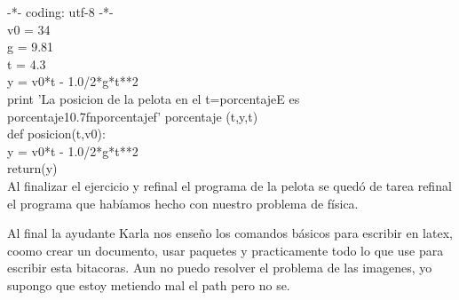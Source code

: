 \documentclass[letterpaper, 12pt, oneside]{article}
\begin{document}
\begin{enumerate}
\begin{enumerate}
			
			
			-*- coding: utf-8 -*-\\
			v0 = 34\\
			g = 9.81\\
			t = 4.3\\
			y = v0*t - 1.0/2*g*t**2\\
			print 'La posicion de la pelota en el t=porcentajeE es porcentaje10.7fnporcentajef' porcentaje (t,y,t)\\
			def posicion(t,v0):\\
			y = v0*t - 1.0/2*g*t**2\\
			return(y)\\
			
			Al finalizar el ejercicio y refinal el programa de la pelota se qued\'o de tarea refinal el programa que hab\'iamos hecho con nuestro problema de f\'isica.
				
			Al final la ayudante Karla nos enseño los comandos b\'asicos para escribir en latex, coomo crear un documento, usar paquetes y practicamente todo lo que use para escribir esta bitacoras. Aun no puedo resolver el problema de las imagenes, yo supongo que estoy metiendo mal el path pero no se.
		\end{enumerate}
	\end{enumerate}
\end{document}
